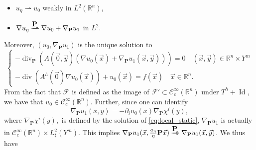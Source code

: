 \documentclass[a4paper,reqno]{amsart}
\numberwithin{equation}{section}
\numberwithin{equation}{section}		%
\numberwithin{figure}{section}			%
\numberwithin{table}{section}				%
\newcommand{\R}{\mathbb{R}}
\newcommand{\ntodo}[1]{\todo[inline, backgroundcolor=blue!20!white, bordercolor=blue]{Niklas: #1}}
\theoremstyle{definition}
\newcommand{\<}{\ensuremath \leq}
\renewcommand{\>}{\ensuremath \geq}
\def\wdto{\buildrel\hbox{$\textbf{P}$}\over
\rightharpoonup \!\!\!\!\! \rightharpoonup}
\def\dto{\buildrel\hbox{$\textbf{P}$}\over
\to \!\!\!\!\! \to}
\begin{document}
\begin{itemize}
    \item $u_\eta\rightharpoonup u_0$ weakly in $L^2(\R^n)$,
    \item $\nabla u_\eta \wdto \nabla u_0 + \nabla_\textbf{P}u_1$ in $L^2$.
\end{itemize}
Moreover, $(u_0,\nabla_\textbf{P}u_1)$ is the unique solution to
\begin{equation}
    \begin{cases}
        -\operatorname{div}_{\textbf{P}}\left(A(\vec 0, \vec y)(\nabla u_0(\vec x) + \nabla_\textbf{P} u_1(\vec x, \vec y))\right)= 0 \quad (\vec x,  \vec y) \in \R^n\times Y^m\\
        -\operatorname{div}\left(A^h(\vec 0)\nabla u_0(\vec x)\right) + u_0(\vec x)= f(\vec x) \quad \vec x \in \R^n.
    \end{cases}
\end{equation}
From the fact that $\mathcal{F}$ is defined as the image of $\mathcal{F}'\subset \mathcal{C}^\infty_c(\mathbb{R}^n)$ under $T^h+\operatorname{Id}$, we have that $u_0\in\mathcal{C}^\infty_c(\mathbb{R}^n)$. Further, since one can identify
\begin{equation}
  \nabla_\textbf{P}  u_1(x,y) =  -\partial_iu_{0}(x) \nabla_\textbf{P}\chi^i(y),
\end{equation}
where $\nabla_\textbf{P}\chi^i(y),$ is defined by the solution of 
\eqref{eq:local_static}, $ \nabla_\textbf{P} u_1$ is actually in $\mathcal{C}^\infty_c(\R^n)\times L^2_\sharp(Y^m)$. 
This implies $ \nabla_\textbf{P}u_1(\vec{x},\frac{a_\eta}{\eta}\textbf{P}\vec{x})\dto  \nabla_\textbf{P}u_1(\vec{x},\vec{y})$.
We thus have
\end{document}

